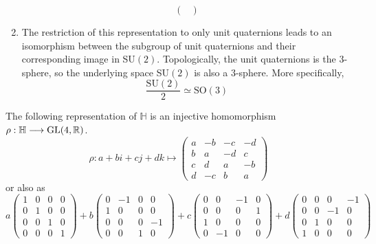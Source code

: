 \begin{proposition}
\begin{enumerate}
\begin{equation}
\begin{pmatrix}
              \end{pmatrix}
            \end{equation}
          \item The restriction of this representation to only unit quaternions leads to an isomorphism between the subgroup of unit quaternions and their corresponding image in SU$(2)$. Topologically, the unit quaternions is the $3$-sphere, so the underlying space SU$(2)$ is also a $3$-sphere. More specifically, 
            \begin{equation}
              \frac{\text{SU}(2)}{2} \simeq \text{SO}(3)
            \end{equation}
        \end{enumerate}
      \end{proposition}

      \begin{proposition}
      The following representation of $\mathbb{H}$ is an injective homomorphism $\rho: \mathbb{H} \longrightarrow \operatorname{GL}(4, \mathbb{R})$. 
      \begin{equation}
        \rho: a+bi+cj+dk \mapsto \begin{pmatrix}
        a&-b&-c&-d \\
        b&a&-d&c\\
        c&d&a&-b\\
        d&-c&b&a
        \end{pmatrix}
      \end{equation}
      or also as
      \begin{equation}
        a \begin{pmatrix}
        1 &0 &0 &0 \\
        0& 1&0&0\\
        0&0&1&0\\
        0&0&0&1
        \end{pmatrix} + b \begin{pmatrix}
        0&-1&0&0\\1&0&0&0\\0&0&0&-1\\0&0&1&0
        \end{pmatrix} + c\begin{pmatrix}
        0&0&-1&0\\0&0&0&1\\1&0&0&0\\0&-1&0&0
        \end{pmatrix} + d \begin{pmatrix}
        0&0&0&-1\\0&0&-1&0\\0&1&0&0\\1&0&0&0

\end{pmatrix}
\end{equation}
\end{proposition}
